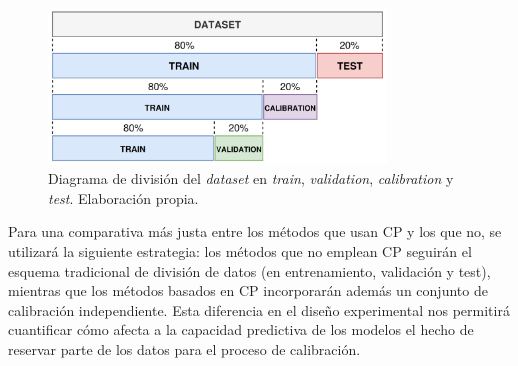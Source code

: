 \begin{figure}[h]
    \centering
    \includegraphics[width=0.8\textwidth]{capitulos/cap_04/imagenes/data_split_conformal.png}
    \caption[
        Diagrama de división del \textit{dataset} en \textit{train}, \textit{validation}, \textit{calibration} 
        y \textit{test}.
    ]{
        Diagrama de división del \textit{dataset} en \textit{train}, \textit{validation}, \textit{calibration}
        y \textit{test}. Elaboración propia.
    } 
    \label{fig:data_split_conformal}
\end{figure}

Para una comparativa más justa entre los métodos que usan CP y los que no, se utilizará la siguiente 
estrategia: los métodos que no emplean CP seguirán el esquema tradicional de división de datos (en 
entrenamiento, validación y test), mientras que los métodos basados en CP incorporarán además un conjunto 
de calibración independiente. Esta diferencia en el diseño experimental nos permitirá cuantificar cómo afecta 
a la capacidad predictiva de los modelos el hecho de reservar parte de los datos para el proceso de 
calibración.








